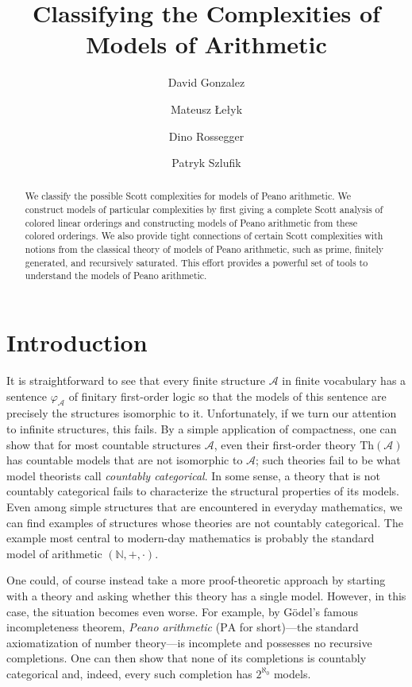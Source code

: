 \documentclass[11pt]{amsart}
\title{Classifying the Complexities of Models of Arithmetic}
\author{David Gonzalez}
\author{Mateusz \L{}e\l{}yk}
\author{Dino Rossegger}
\author{Patryk Szlufik}
\newcommand{\A}{\mathcal{A}}
\newcommand{\PA}{\mathrm{PA}}
\newcommand{\Th}{\mathrm{Th}}
\renewcommand{\phi}{\varphi}
\def\A{\mathcal A}
\theoremstyle{remark}
\begin{document}
\maketitle
\begin{abstract}
    We classify the possible Scott complexities for models of Peano arithmetic.
We construct models of particular complexities by first giving a complete Scott analysis of colored linear orderings and constructing models of Peano arithmetic from these colored orderings.
We also provide tight connections of certain Scott complexities with notions from the classical theory of models of Peano arithmetic, such as prime, finitely generated, and recursively saturated. 
This effort provides a powerful set of tools to understand the models of Peano arithmetic.
\end{abstract}

\section{Introduction}





It is straightforward to see that every finite structure $\A$ in finite vocabulary has a sentence $\phi_\A$ of finitary first-order logic so that the models of this sentence are precisely the structures isomorphic to it. Unfortunately, if we turn our attention to infinite structures, this fails. By a simple application of compactness, one can show that for most countable structures $\A$, even their first-order theory $\Th(\A)$ has countable models that are not isomorphic to $\A$; such theories fail to be what model theorists call \emph{countably categorical}. In some sense, a theory that is not countably categorical fails to characterize the structural properties of its models. Even among simple structures that are encountered in everyday mathematics, we can find examples of structures whose theories are not countably categorical. The example most central to modern-day mathematics is probably the standard model of arithmetic $(\mathbb N,+,\cdot)$. 

One could, of course instead take a more proof-theoretic approach by starting with a theory and asking whether this theory has a single model. However, in this case, the situation becomes even worse. For example, by Gödel's famous incompleteness theorem, \emph{Peano arithmetic} ($\PA$ for short)---the standard axiomatization of number theory---is incomplete and possesses no recursive completions. One can then show that none of its completions is countably categorical and, indeed, every such completion has $2^{\aleph_0}$ models.
\end{document}
